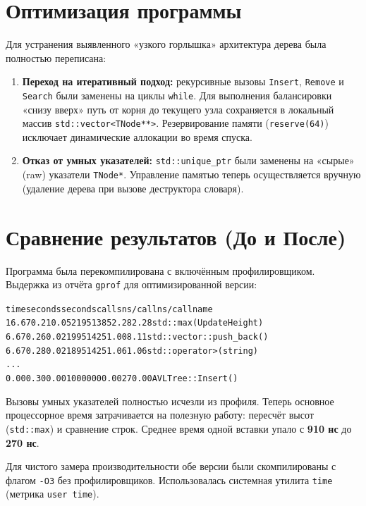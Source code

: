 \section{Оптимизация программы}

Для устранения выявленного «узкого горлышка» архитектура дерева была полностью переписана:
\begin{enumerate}
    \item \textbf{Переход на итеративный подход:} рекурсивные вызовы \texttt{Insert}, \texttt{Remove} и \texttt{Search} были заменены на циклы \texttt{while}. Для выполнения балансировки «снизу вверх» путь от корня до текущего узла сохраняется в локальный массив \texttt{std::vector<TNode**>}. Резервирование памяти (\texttt{reserve(64)}) исключает динамические аллокации во время спуска.
    \item \textbf{Отказ от умных указателей:} \texttt{std::unique\_ptr} были заменены на «сырые» (raw) указатели \texttt{TNode*}. Управление памятью теперь осуществляется вручную (удаление дерева при вызове деструктора словаря).
\end{enumerate}

\section{Сравнение результатов (До и После)}

Программа была перекомпилирована с включённым профилировщиком. Выдержка из отчёта \texttt{gprof} для оптимизированной версии:
\begin{alltt}
 time   seconds   seconds    calls  ns/call  ns/call  name    
 16.67      0.21     0.05 21951385     2.28     2.28  std::max (UpdateHeight)
  6.67      0.26     0.02 19951425     1.00     8.11  std::vector::push_back()
  6.67      0.28     0.02 18951425     1.06     1.06  std::operator> (string)
  ...
  0.00      0.30     0.00  1000000     0.00   270.00  AVLTree::Insert()
\end{alltt}
Вызовы умных указателей полностью исчезли из профиля. Теперь основное процессорное время затрачивается на полезную работу: пересчёт высот (\texttt{std::max}) и сравнение строк. Среднее время одной вставки упало с \textbf{910 нс} до \textbf{270 нс}.

Для чистого замера производительности обе версии были скомпилированы с флагом \texttt{-O3} без профилировщиков. Использовалась системная утилита \texttt{time} (метрика \texttt{user time}). 

